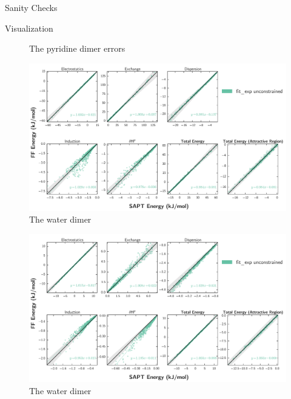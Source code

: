 \begin{subsection}{Sanity Checks}
\begin{paragraph}{Visualization}
\begin{figure}
\centering
{}
\caption[Errors with the pyridine dimer]
{The pyridine dimer errors}
\label{fig:pointer-pyridine_errors}
\end{figure}

\begin{figure}
\centering
\includegraphics[width=\textwidth]{pointer/water/sapt_comparison.pdf}
\caption[Comparison with the water dimer]
{The water dimer}
\label{fig:pointer-water_fits}
\end{figure}


\begin{figure}
\centering
\includegraphics[width=\textwidth]{pointer/water/asymptotic_sapt_comparison.pdf}
\caption[Comparison with the water dimer]
{The water dimer}
\label{fig:pointer-asymptotic_water_fits}
\end{figure}


\end{paragraph}
\end{subsection}
